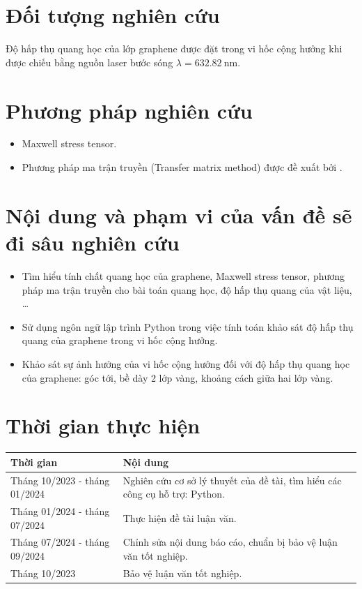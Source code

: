 \documentclass[13pt, a4paper]{elsarticle}
\begin{document}
\section{Đối tượng nghiên cứu}
Độ hấp thụ quang học của lớp graphene được đặt trong vi hốc cộng hưởng khi được chiếu bằng nguồn laser bước sóng $\lambda=\SI{632.82}{\nano\meter}$.
\section{Phương pháp nghiên cứu}
\begin{itemize}
	\item Maxwell stress tensor.
	\item Phương pháp ma trận truyền (Transfer matrix method) được đề xuất bởi \cite{ZhanTMM}.
\end{itemize}
\section{Nội dung và phạm vi của vấn đề sẽ đi sâu nghiên cứu}
\begin{itemize}
	\item Tìm hiểu tính chất quang học của graphene, Maxwell stress tensor, phương pháp ma trận truyền cho bài toán quang học, độ hấp thụ quang của vật liệu, \dots
	\item Sử dụng ngôn ngữ lập trình Python trong việc tính toán khảo sát độ hấp thụ quang của graphene trong vi hốc cộng hưởng.
	\item Khảo sát sự ảnh hưởng của vi hốc cộng hưởng đối với độ hấp thụ quang học của graphene: góc tới, bề dày 2 lớp vàng, khoảng cách giữa hai lớp vàng.
\end{itemize}
\section{Thời gian thực hiện}
\begin{tabular}{|>{\centering\arraybackslash}m{6cm}|>{\centering\arraybackslash}m{9cm}|}
	\hline
	\textbf{Thời gian} & \textbf{Nội dung}\\
	\hline
	Tháng 10/2023 - tháng 01/2024 & Nghiên cứu cơ sở lý thuyết của đề tài, tìm hiểu các công cụ hỗ trợ: Python.\\
	\hline
	Tháng 01/2024 - tháng 07/2024 & Thực hiện đề tài luận văn.\\
	\hline
	Tháng 07/2024 - tháng 09/2024 & Chỉnh sửa nội dung báo cáo, chuẩn bị bảo vệ luận văn tốt nghiệp.\\
	\hline
	Tháng 10/2023 & Bảo vệ luận văn tốt nghiệp.\\
	\hline
\end{tabular}


\end{document}

